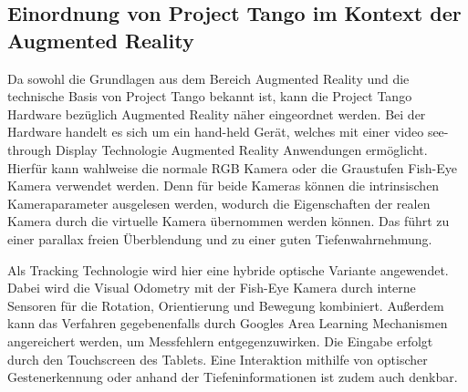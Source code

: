 \subsection{Einordnung von Project Tango im Kontext der Augmented Reality} \label{sec:classification_project_tango}

Da sowohl die Grundlagen aus dem Bereich Augmented Reality und die technische Basis von Project Tango bekannt ist, kann die Project Tango Hardware bezüglich Augmented Reality näher eingeordnet werden. Bei der Hardware handelt es sich um ein hand-held Gerät, welches mit einer video see-through Display Technologie Augmented Reality Anwendungen ermöglicht. Hierfür kann wahlweise die normale RGB Kamera oder die Graustufen Fish-Eye Kamera verwendet werden. Denn für beide Kameras können die intrinsischen Kameraparameter ausgelesen werden, wodurch die Eigenschaften der realen Kamera durch die virtuelle Kamera übernommen werden können. Das führt zu einer parallax freien Überblendung und zu einer guten Tiefenwahrnehmung. 

Als Tracking Technologie wird hier eine hybride optische Variante angewendet. Dabei wird die Visual Odometry mit der Fish-Eye Kamera durch interne Sensoren für die Rotation, Orientierung und Bewegung kombiniert. Außerdem kann das Verfahren gegebenenfalls durch Googles Area Learning Mechanismen angereichert werden, um Messfehlern entgegenzuwirken. Die Eingabe erfolgt durch den Touchscreen des Tablets. Eine Interaktion mithilfe von optischer Gestenerkennung oder anhand der Tiefeninformationen ist zudem auch denkbar. 


